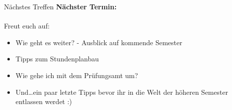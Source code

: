 %	
%	
%	
%	

%

\begin{frame}{Nächstes Treffen}
	\centering \Huge \alert{\textbf{Nächster Termin:}} \\
	\Large \neuerTermin \\[.7cm]
	\normalsize\flushleft
	Freut euch auf:
	\begin{itemize}
		\item Wie geht es weiter? - Ausblick auf kommende Semester
		\item Tipps zum Stundenplanbau
		\item Wie gehe ich mit dem Prüfungsamt um?
		\item Und\dots ein paar letzte Tipps bevor ihr in die Welt der höheren Semester entlassen werdet :)
	\end{itemize}
\end{frame}


